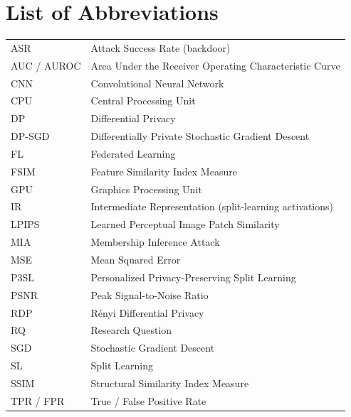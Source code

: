\documentclass[11pt,a4paper,oneside]{report}
\begin{document}
\tableofcontents
\listoftables
\listoffigures

\clearpage

\chapter*{List of Abbreviations}
\thispagestyle{plain}

\vspace{1em}
\begin{tabular}{@{}p{}p{}@{}}
ASR & Attack Success Rate (backdoor) \\
AUC / AUROC & Area Under the Receiver Operating Characteristic Curve \\
CNN & Convolutional Neural Network \\
CPU & Central Processing Unit \\
DP & Differential Privacy \\
DP-SGD & Differentially Private Stochastic Gradient Descent \\
FL & Federated Learning \\
FSIM & Feature Similarity Index Measure \\
GPU & Graphics Processing Unit \\
IR & Intermediate Representation (split-learning activations) \\
LPIPS & Learned Perceptual Image Patch Similarity \\
MIA & Membership Inference Attack \\
MSE & Mean Squared Error \\
P3SL & Personalized Privacy-Preserving Split Learning \\
PSNR & Peak Signal-to-Noise Ratio \\
RDP & R\'enyi Differential Privacy \\
RQ & Research Question \\
SGD & Stochastic Gradient Descent \\
SL & Split Learning \\
SSIM & Structural Similarity Index Measure \\
TPR / FPR & True / False Positive Rate \\
\end{tabular}
\end{document}
